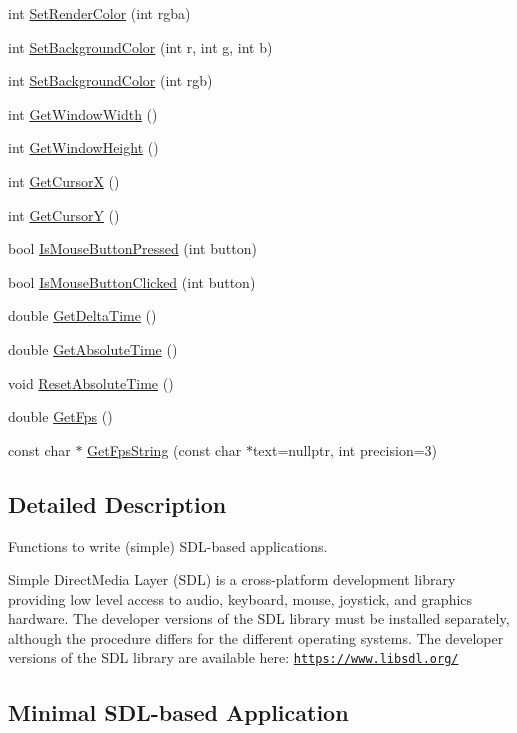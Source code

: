 \begin{DoxyCompactItemize}
int \hyperlink{group__sdl__group_gaa5ac5769b86fd14f41fc2421e8e029bc}{Set\+Render\+Color} (int rgba)
\item 
int \hyperlink{group__sdl__group_ga540012b7df5eddd0b109543deaa66a22}{Set\+Background\+Color} (int r, int g, int b)
\item 
int \hyperlink{group__sdl__group_gaa80de83a7c03984305662ae0ca5daa05}{Set\+Background\+Color} (int rgb)
\item 
int \hyperlink{group__sdl__group_gaa938d3f784d26ccd4ed8c2d83bbc6ab4}{Get\+Window\+Width} ()
\item 
int \hyperlink{group__sdl__group_gac27ddd893a70056c55278b33d7bd2c62}{Get\+Window\+Height} ()
\item 
int \hyperlink{group__sdl__group_ga7c508c83150dcd127156d9c4e2436a8e}{Get\+CursorX} ()
\item 
int \hyperlink{group__sdl__group_ga4769e37502d12fbc431ace1a32749bc8}{Get\+CursorY} ()
\item 
bool \hyperlink{group__sdl__group_ga2537bad9d6f115fee49a741e7e2623a6}{Is\+Mouse\+Button\+Pressed} (int button)
\item 
bool \hyperlink{group__sdl__group_ga8f17cac7776ed1c12041101c8abb740b}{Is\+Mouse\+Button\+Clicked} (int button)
\item 
double \hyperlink{group__sdl__group_gaf9e3349b29171ad58521f5a7a6238fca}{Get\+Delta\+Time} ()
\item 
double \hyperlink{group__sdl__group_ga9b9387d774c6bc63e5e3c6c91296dedb}{Get\+Absolute\+Time} ()
\item 
void \hyperlink{group__sdl__group_ga5b39467f3664fad21ce3c0f14c4506ff}{Reset\+Absolute\+Time} ()
\item 
double \hyperlink{group__sdl__group_gaa48ddc248a57dfa1e4afdd6be2a76531}{Get\+Fps} ()
\item 
const char $\ast$ \hyperlink{group__sdl__group_ga236d5b80ee4ca0a1abe0ae054f7fbe2f}{Get\+Fps\+String} (const char $\ast$text=nullptr, int precision=3)
\end{DoxyCompactItemize}


\subsection{Detailed Description}
Functions to write (simple) S\+D\+L-\/based applications. 

Simple Direct\+Media Layer (S\+DL) is a cross-\/platform development library providing low level access to audio, keyboard, mouse, joystick, and graphics hardware. The developer versions of the S\+DL library must be installed separately, although the procedure differs for the different operating systems. The developer versions of the S\+DL library are available here\+: \href{https://www.libsdl.org/}{\tt https\+://www.\+libsdl.\+org/}\hypertarget{group__sdl__group_sdl_example_sect}{}\subsection{Minimal S\+D\+L-\/based Application}\label{group__sdl__group_sdl_example_sect}

